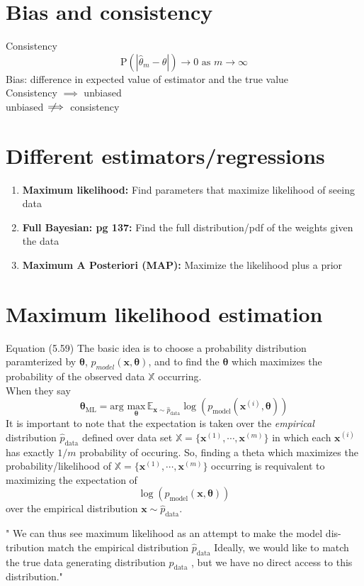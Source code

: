 \documentclass{article}
\newcommand{\beq}{\begin{equation}}
\newcommand{\eeq}{\end{equation}}
\newcommand{\notimplies}{\;\not\!\!\!\implies}
\begin{document}
\section{Bias and consistency}
Consistency
\beq
\text{P}(|\hat{\theta}_m - \theta|) \rightarrow 0 \text{ as } m \rightarrow \infty
\eeq
Bias: difference in expected value of estimator and the true value\\
Consistency $\implies$ unbiased\\
unbiased $\notimplies$ consistency
%
%
\section{Different estimators/regressions}
\begin{enumerate}
\item{\textbf{Maximum likelihood: } Find parameters that maximize likelihood of seeing data}
\item{\textbf{Full Bayesian: pg 137:} Find the full distribution/pdf of the weights given the data}
\item{\textbf{Maximum A Posteriori (MAP):} Maximize the likelihood plus a prior}  
\end{enumerate}
%
%
\section{\label{sect:mle}Maximum likelihood estimation}
Equation (5.59) The basic idea is to choose a probability distribution paramterized by $\pmb{\theta}$, $p_{model}(\pmb{x},\pmb{\theta})$, and to find the $\pmb{\theta}$ which maximizes the probability of the observed data $\mathbb{X}$ occurring.\\
When they say
\beq
\mathbf{\theta}_{\text{ML}} = \text{arg } \underset{\pmb{\theta}}{\text{max}} \, \mathbb{E}_{\mathbf{x}\sim\hat{p}_{\text{data}}}\log(p_{\text{model}}(\pmb{x}^{(i)},\pmb{\theta}))
\eeq
It is important to note that the expectation is taken over the \textit{empirical} distribution $\hat{p}_{\text{data}}$ defined over data set $\mathbb{X}=\{\pmb{x}^{(1)},\cdots,\pmb{x}^{(m)}\}$ in which each $\pmb{x}^{(i)}$ has exactly $1/m$ probability of occuring. So, finding a theta which maximizes the probability/likelihood of $\mathbb{X}=\{\pmb{x}^{(1)},\cdots,\pmb{x}^{(m)}\}$ occurring is requivalent to maximizing the expectation of
\beq
\log(p_{\text{model}}(\pmb{x},\pmb{\theta}))
\eeq
over the empirical distribution $\mathbf{x}\sim\hat{p}_{\text{data}}$.

" We can thus see maximum likelihood as an attempt to make the model dis-
tribution match the empirical distribution $\hat{p}_{\text{data}}$ Ideally, we would like to match
the true data generating distribution $p_{\text{data}}$ , but we have no direct access to this
distribution."\\
\end{document}
